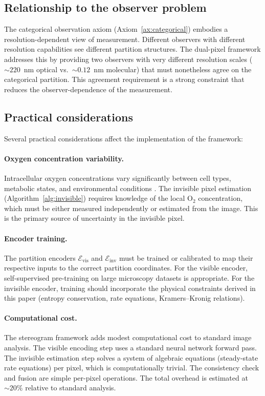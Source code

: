 \documentclass[11pt,twocolumn,a4paper]{article}
\begin{document}
\subsection{Relationship to the observer problem}

The categorical observation axiom (Axiom~\ref{ax:categorical}) embodies a resolution-dependent view of measurement.
Different observers with different resolution capabilities see different partition structures.
The dual-pixel framework addresses this by providing two observers with very different resolution scales (${\sim}220$~nm optical vs.\ ${\sim}0.12$~nm molecular) that must nonetheless agree on the categorical partition.
This agreement requirement is a strong constraint that reduces the observer-dependence of the measurement.

\subsection{Practical considerations}

Several practical considerations affect the implementation of the framework:

\paragraph{Oxygen concentration variability.}
Intracellular oxygen concentrations vary significantly between cell types, metabolic states, and environmental conditions \citep{Carreau2011}.
The invisible pixel estimation (Algorithm~\ref{alg:invisible}) requires knowledge of the local O$_2$ concentration, which must be either measured independently or estimated from the image.
This is the primary source of uncertainty in the invisible pixel.

\paragraph{Encoder training.}
The partition encoders $\mathcal{E}_{\mathrm{vis}}$ and $\mathcal{E}_{\mathrm{inv}}$ must be trained or calibrated to map their respective inputs to the correct partition coordinates.
For the visible encoder, self-supervised pre-training on large microscopy datasets is appropriate.
For the invisible encoder, training should incorporate the physical constraints derived in this paper (entropy conservation, rate equations, Kramers--Kronig relations).

\paragraph{Computational cost.}
The stereogram framework adds modest computational cost to standard image analysis.
The visible encoding step uses a standard neural network forward pass.
The invisible estimation step solves a system of algebraic equations (steady-state rate equations) per pixel, which is computationally trivial.
The consistency check and fusion are simple per-pixel operations.
The total overhead is estimated at ${\sim}20\%$ relative to standard analysis.
\end{document}
